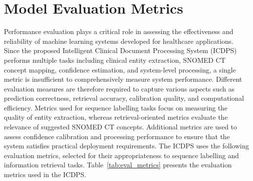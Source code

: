 \section{Model Evaluation Metrics}

Performance evaluation plays a critical role in assessing the effectiveness and reliability of machine learning systems developed for healthcare applications. Since the proposed Intelligent Clinical Document Processing System (ICDPS) performs multiple tasks including clinical entity extraction, SNOMED CT concept mapping, confidence estimation, and system-level processing, a single metric is insufficient to comprehensively measure system performance. Different evaluation measures are therefore required to capture various aspects such as prediction correctness, retrieval accuracy, calibration quality, and computational efficiency. Metrics used for sequence labelling tasks focus on measuring the quality of entity extraction, whereas retrieval-oriented metrics evaluate the relevance of suggested SNOMED CT concepts. Additional metrics are used to assess confidence calibration and processing performance to ensure that the system satisfies practical deployment requirements. The ICDPS uses the following evaluation metrics, selected for their appropriateness to sequence labelling and information retrieval tasks. Table~\ref{tab:eval_metrics} presents the evaluation metrics used in the ICDPS.

